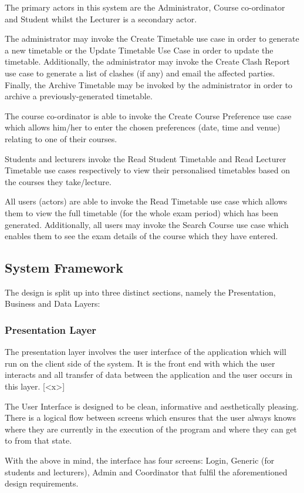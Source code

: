 \documentclass{article}
\begin{document}
The primary actors in this system are the Administrator, Course co-ordinator and Student whilst the Lecturer is a secondary actor. 

The administrator may invoke the Create Timetable use case in order to generate a new timetable or the Update Timetable Use Case in order to update the timetable. Additionally, the administrator may invoke the Create Clash Report use case to generate a list of clashes (if any) and email the affected parties. Finally, the Archive Timetable may be invoked by the administrator in order to archive a previously-generated timetable.

The course co-ordinator is able to invoke the Create Course Preference use case which allows him/her to enter the chosen preferences (date, time and venue) relating to one of their courses.

Students and lecturers invoke the Read Student Timetable and Read Lecturer Timetable use cases respectively to view their personalised timetables based on the courses they take/lecture.

All users (actors) are able to invoke the Read Timetable use case which allows them to view the full timetable (for the whole exam period) which has been generated. Additionally, all users may invoke the Search Course use case which enables them to see the exam details of the course which they have entered.

\subsection{System Framework}
The design is split up into three distinct sections, namely the Presentation, Business and Data Layers: 

\subsubsection{Presentation Layer}
The presentation layer involves the user interface of the application which will run on the client side of the system. It is the front end with which the user
interacts and all transfer of data between the application and the user occurs in this layer. [<x>]

The User Interface is designed to be clean, informative and aesthetically pleasing. There is a logical flow
between screens which ensures that the user always knows where they are currently in the execution of
the program and where they can get to from that state.

With the above in mind, the interface has four screens: Login, Generic (for students and lecturers), Admin and Coordinator that fulfil the aforementioned design requirements.
\end{document}

